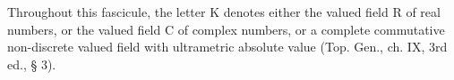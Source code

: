 
Throughout this fascicule, the letter K denotes either the valued field R of real numbers, or the valued field C of complex numbers, or a complete commutative non-discrete valued field with ultrametric absolute value (Top. Gen., ch. IX, 3rd ed., § 3).

